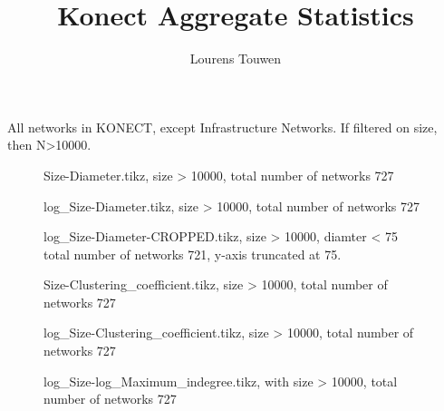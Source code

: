 \documentclass[fleqn]{article}
\title{Konect Aggregate Statistics}
\author{Lourens Touwen}
\begin{document}
	
	\pagestyle{plain}
	
	\maketitle
	
	\newlength\fheight 
	\newlength\fwidth 
	\setlength{} 
	\setlength{}
	
	
	All networks in KONECT, except Infrastructure Networks. If filtered on size, then N>10000.
	
	\begin{figure}[!htb]
		\centering
		
		\caption{Size-Diameter.tikz, size > 10000, total number of networks 727}
	\end{figure}

	\begin{figure}[!htb]
		\centering
		
		\caption{log\_Size-Diameter.tikz, size > 10000, total number of networks 727}
	\end{figure}

	\begin{figure}[!htb]
		\centering
		
		\caption{log\_Size-Diameter-CROPPED.tikz, size > 10000, diamter < 75 total number of networks 721, y-axis truncated at 75.}
	\end{figure}

	\begin{figure}[!htb]
		\centering
		
		\caption{Size-Clustering\_coefficient.tikz, size > 10000, total number of networks 727}
	\end{figure}

	\begin{figure}[!htb]
		\centering
		
		\caption{log\_Size-Clustering\_coefficient.tikz, size > 10000, total number of networks 727}
	\end{figure}
	
	\begin{figure}[!htb]
		\centering
		
		\caption{log\_Size-log\_Maximum\_indegree.tikz, with size > 10000, total number of networks 727}
	\end{figure}	
\end{document}
